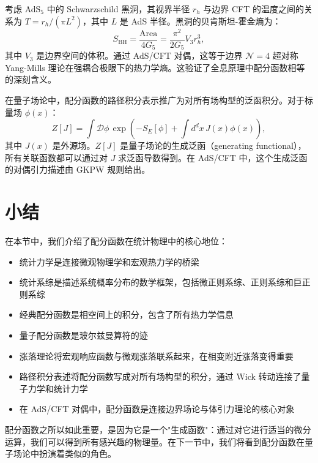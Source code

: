 \begin{example}
考虑 AdS$_5$ 中的 Schwarzschild 黑洞，其视界半径 $r_h$ 与边界 CFT 的温度之间的关系为 $T = r_h/(\pi L^2)$，其中 $L$ 是 AdS 半径。黑洞的贝肯斯坦-霍金熵为：
\begin{equation}
    S_{\text{BH}} = \frac{\text{Area}}{4G_5} = \frac{\pi^2}{2G_5} V_3 r_h^3,
\end{equation}
其中 $V_3$ 是边界空间的体积。通过 AdS/CFT 对偶，这等于边界 $\mathcal{N}=4$ 超对称 Yang-Mills 理论在强耦合极限下的热力学熵。这验证了全息原理中配分函数相等的深刻含义。
\end{example}

\begin{note}[路径积分在量子场论中的推广]
在量子场论中，配分函数的路径积分表示推广为对所有场构型的泛函积分。对于标量场 $\phi(x)$：
\begin{equation}
    Z[J] = \int \mathcal{D}\phi \, \exp\left(-S_E[\phi] + \int d^dx \, J(x)\phi(x)\right),
\end{equation}
其中 $J(x)$ 是外源场。$Z[J]$ 是量子场论的生成泛函（generating functional），所有关联函数都可以通过对 $J$ 求泛函导数得到。在 AdS/CFT 中，这个生成泛函的对偶引力描述由 GKPW 规则给出\cite{Maldacena1997}。
\end{note}

\section{小结}

在本节中，我们介绍了配分函数在统计物理中的核心地位：
\begin{itemize}
    \item 统计力学是连接微观物理学和宏观热力学的桥梁
    \item 统计系综是描述系统概率分布的数学框架，包括微正则系综、正则系综和巨正则系综
    \item 经典配分函数是相空间上的积分，包含了所有热力学信息
    \item 量子配分函数是玻尔兹曼算符的迹
    \item 涨落理论将宏观响应函数与微观涨落联系起来，在相变附近涨落变得重要\cite{Landau1937}
    \item 路径积分表述将配分函数写成对所有场构型的积分，通过 Wick 转动连接了量子力学和统计力学
    \item 在 AdS/CFT 对偶中，配分函数是连接边界场论与体引力理论的核心对象\cite{Maldacena1997}
\end{itemize}
配分函数之所以如此重要，是因为它是一个"生成函数"：通过对它进行适当的微分运算，我们可以得到所有感兴趣的物理量。在下一节中，我们将看到配分函数在量子场论中扮演着类似的角色。


